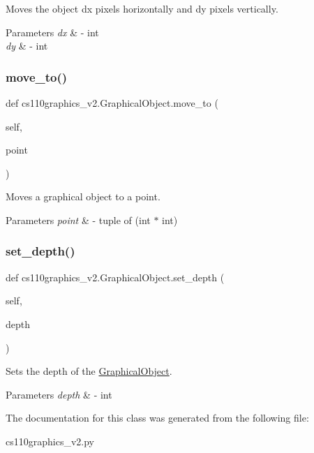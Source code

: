 Moves the object dx pixels horizontally and dy pixels vertically. 


\begin{DoxyParams}{Parameters}
{\em dx} & -\/ int \\
\hline
{\em dy} & -\/ int \\
\hline
\end{DoxyParams}
\mbox{\label{classcs110graphics__v2_1_1GraphicalObject_ab6ac4af925b79fec3ca93b3fafed82ff}} 
\subsubsection{\texorpdfstring{move\_to()}{move\_to()}}
{\footnotesize\ttfamily def cs110graphics\+\_\+v2.\+Graphical\+Object.\+move\+\_\+to (\begin{DoxyParamCaption}\item[{}]{self,  }\item[{}]{point }\end{DoxyParamCaption})}



Moves a graphical object to a point. 


\begin{DoxyParams}{Parameters}
{\em point} & -\/ tuple of (int $\ast$ int) \\
\hline
\end{DoxyParams}
\mbox{\label{classcs110graphics__v2_1_1GraphicalObject_a070f9867df491e5b2371992be96c3529}} 
\subsubsection{\texorpdfstring{set\_depth()}{set\_depth()}}
{\footnotesize\ttfamily def cs110graphics\+\_\+v2.\+Graphical\+Object.\+set\+\_\+depth (\begin{DoxyParamCaption}\item[{}]{self,  }\item[{}]{depth }\end{DoxyParamCaption})}



Sets the depth of the \mbox{\hyperlink{classcs110graphics__v2_1_1GraphicalObject}{Graphical\+Object}}. 


\begin{DoxyParams}{Parameters}
{\em depth} & -\/ int \\
\hline
\end{DoxyParams}


The documentation for this class was generated from the following file\+:\begin{DoxyCompactItemize}
\item 
cs110graphics\+\_\+v2.\+py\end{DoxyCompactItemize}
